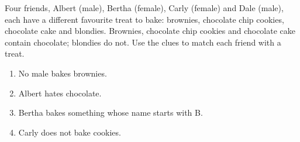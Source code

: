 Four friends, Albert (male), Bertha (female), Carly (female) and Dale (male), each have a different favourite treat to bake: brownies, chocolate chip cookies, chocolate cake and blondies. Brownies, chocolate chip cookies and chocolate cake contain chocolate; blondies do not. Use the clues to match each friend with a treat.
\begin{enumerate}
\item[1.] No male bakes brownies.
\item[2.] Albert hates chocolate.
\item[3.] Bertha bakes something whose name starts with B.
\item[4.] Carly does not bake cookies.
\end{enumerate}
